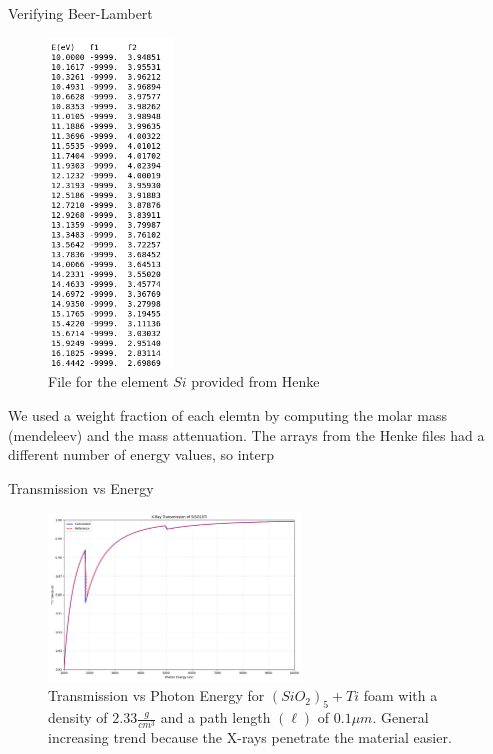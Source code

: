 \documentclass[aspectratio=169,xcolor=dvipsnames]{beamer}
\begin{document}
\begin{frame}{Verifying Beer-Lambert}
  \begin{figure}[h!]
    \centering
    \includegraphics[width=0.295\textwidth]{Screenshot 2025-07-30 at 19-29-12 .png}
    \caption{File for the element $Si$ provided from Henke}
  \end{figure}
We used a weight fraction of each elemtn by computing the molar mass (mendeleev) and the mass attenuation.
The arrays from the Henke files had a different number of energy values, so interp
\end{frame}

\begin{frame}{Transmission vs Energy}
  \begin{figure}[h!]
    \centering
    \includegraphics[width=0.6\textwidth]{energy_vs_transmission.png}
    \caption{Transmission vs Photon Energy for $(SiO_2)_5 + Ti$ foam with a density of $2.33 \frac{g}{cm^3}$ and a path length $(\ell)$ of $0.1 \mu m$. General increasing trend because the X-rays penetrate the material easier.}
  \end{figure}
\end{frame}
\end{document}
